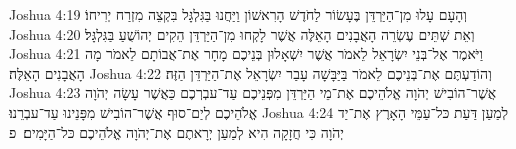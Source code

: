 Joshua 4:19	וְהָעָם עָלוּ מִן־הַיַּרְדֵּן בֶּעָשׂוֹר לַחֹדֶשׁ הָרִאשׁוֹן וַיַּחֲנוּ בַּגִּלְגָּל בִּקְצֵה מִזְרַח יְרִיחוֹ׃
Joshua 4:20	וְאֵת שְׁתֵּים עֶשְׂרֵה הָאֲבָנִים הָאֵלֶּה אֲשֶׁר לָקְחוּ מִן־הַיַּרְדֵּן הֵקִים יְהוֹשֻׁעַ בַּגִּלְגָּל׃
Joshua 4:21	וַיֹּאמֶר אֶל־בְּנֵי יִשְׂרָאֵל לֵאמֹר אֲשֶׁר יִשְׁאָלוּן בְּנֵיכֶם מָחָר אֶת־אֲבוֹתָם לֵאמֹר מָה הָאֲבָנִים הָאֵלֶּה׃
Joshua 4:22	וְהוֹדַעְתֶּם אֶת־בְּנֵיכֶם לֵאמֹר בַּיַּבָּשָׁה עָבַר יִשְׂרָאֵל אֶת־הַיַּרְדֵּן הַזֶּה׃
Joshua 4:23	אֲשֶׁר־הוֹבִישׁ יְהֹוָה אֱלֹהֵיכֶם אֶת־מֵי הַיַּרְדֵּן מִפְּנֵיכֶם עַד־עבְרְכֶם כַּאֲשֶׁר עָשָׂה יְהֹוָה אֱלֹהֵיכֶם לְיַם־סוּף אֲשֶׁר־הוֹבִישׁ מִפָּנֵינוּ עַד־עבְרֵנוּ׃
Joshua 4:24	לְמַעַן דַּעַת כּל־עַמֵּי הָאָרֶץ אֶת־יַד יְהֹוָה כִּי חֲזָקָה הִיא לְמַעַן יְרָאתֶם אֶת־יְהֹוָה אֱלֹהֵיכֶם כּל־הַיָּמִים׃ {פ}
